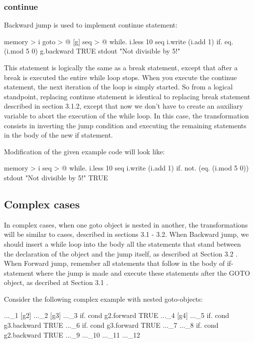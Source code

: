 \documentclass[sigplan,review,11pt,nonacm,natbib=false]{acmart}
\begin{document}
\subsubsection{continue}
Backward jump is used to implement continue statement:

\begin{ffcode}
[]
 memory > i
 goto > @
  [g]
   seq > @
    while.
     i.less 10
     seq
      i.write (i.add 1)
      if.
       eq. (i.mod 5 0)
       g.backward
       TRUE
      stdout "Not divisible by 5!\n"
\end{ffcode}

This statement is logically the same as a break statement, except that after a break is executed the entire while loop stops. When you execute the continue statement, the next iteration of the loop is simply started.
So from a logical standpoint, replacing continue statement is identical to replacing break statement described in section 3.1.2, except that now we don't have to create an auxiliary variable to abort the execution of the while loop. In this case, the transformation consists in inverting the jump condition and executing the remaining statements in the body of the new if statement.

Modification of the given example code will look like:
\begin{ffcode}
[]
 memory > i
 seq > @
 while.
  i.less 10
  seq
   i.write (i.add 1)
   if.
    not. (eq. (i.mod 5 0))
    stdout "Not divisible by 5!\n"
    TRUE
\end{ffcode}


\subsection{Complex cases}
In complex cases, when one goto object is nested in another, the transformations will be similar to cases, described in sections 3.1 - 3.2. When Backward jump, we should insert a while loop into the body all the statements that stand between the declaration of the object and the jump itself, as described at Section 3.2 . When Forward jump, remember all statements that follow in the body of if-statement where the jump is made and execute these statements after the GOTO object, as decribed at Section 3.1 .

Consider the following complex example with nested goto-objects:
\begin{ffcode}
[g1]
 ..._1
 [g2]
  ..._2
  [g3]
   ..._3
   if.
    cond
    g2.forward
    TRUE
   ..._4
   [g4]
    ..._5
    if.
     cond
     g3.backward
     TRUE
    ..._6
    if.
     cond
     g3.forward
     TRUE
    ..._7
   ..._8
   if.
    cond
    g2.backward
    TRUE
   ..._9
  ..._10
 ..._11
..._12
\end{ffcode}
\end{document}
